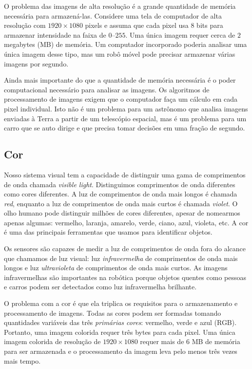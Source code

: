 O problema das imagens de alta resolução é a grande quantidade de memória necessária para armazená-las. Considere uma tela de computador de alta resolução com $1920\times 1080$ pixels e assuma que cada pixel usa $8$ bits para armazenar intensidade na faixa de $0$--$255$. Uma única imagem requer cerca de $2$ megabytes (MB) de memória. Um computador incorporado poderia analisar uma única imagem desse tipo, mas um robô móvel pode precisar armazenar várias imagens por segundo.

Ainda mais importante do que a quantidade de memória necessária é o poder computacional necessário para analisar as imagens. Os algoritmos de processamento de imagens exigem que o computador faça um cálculo em cada pixel individual. Isto não é um problema para um astrônomo que analisa imagens enviadas à Terra a partir de um telescópio espacial, mas é um problema para um carro que se auto dirige e que precisa tomar decisões em uma fração de segundo.

\subsection*{Cor}

Nosso sistema visual tem a capacidade de distinguir uma gama de comprimentos de onda chamada \emph{visible light}. Distinguimos comprimentos de onda diferentes como cores diferentes. A luz de comprimentos de onda mais longos é chamada \emph{red}, enquanto a luz de comprimentos de onda mais curtos é chamada \emph{violet}. O olho humano pode distinguir milhões de cores diferentes, apesar de nomearmos apenas algumas: vermelho, laranja, amarelo, verde, ciano, azul, violeta, etc. A cor é uma das principais ferramentas que usamos para identificar objetos.

Os sensores são capazes de medir a luz de comprimentos de onda fora do alcance que chamamos de luz visual: luz \emph{infravermelha} de comprimentos de onda mais longos e luz \emph{ultravioleta} de comprimentos de onda mais curtos. As imagens infravermelhas são importantes na robótica porque objetos quentes como pessoas e carros podem ser detectados como luz infravermelha brilhante.

O problema com a cor é que ela triplica os requisitos para o armazenamento e processamento de imagens. Todas as cores podem ser formadas tomando quantidades variáveis das três \emph{primárias cores}: vermelho, verde e azul (RGB). Portanto, uma imagem colorida requer três bytes para cada pixel. Uma única imagem colorida de resolução de $1920\times 1080$ requer mais de $6$ MB de memória para ser armazenada e o processamento da imagem leva pelo menos três vezes mais tempo.

